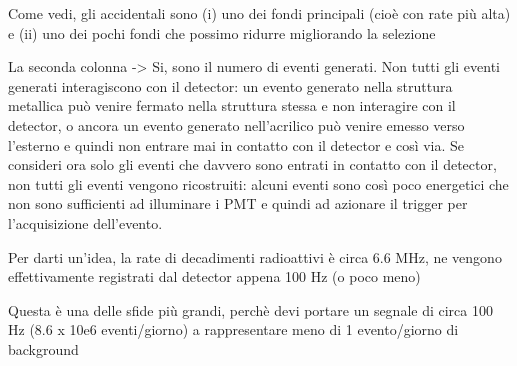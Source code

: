Come vedi, gli accidentali sono (i) uno dei fondi principali (cioè con rate più alta) e (ii) uno dei pochi fondi che possimo ridurre migliorando la selezione

La seconda colonna -> Si, sono il numero di eventi generati. Non tutti gli eventi generati interagiscono con il detector: un evento generato nella struttura metallica può venire fermato nella struttura stessa e non interagire con il detector, o ancora un evento generato nell'acrilico può venire emesso verso l'esterno e quindi non entrare mai in contatto con il detector e così via.
Se consideri ora solo gli eventi che davvero sono entrati in contatto con il detector, non tutti gli eventi vengono ricostruiti: alcuni eventi sono così poco energetici che non sono sufficienti ad illuminare i PMT e quindi ad azionare il trigger per l'acquisizione dell'evento.

Per darti un'idea, la rate di decadimenti radioattivi è circa 6.6 MHz, ne vengono effettivamente registrati dal detector appena 100 Hz (o poco meno)

Questa è una delle sfide più grandi, perchè devi portare un segnale di circa 100 Hz (8.6 x 10e6 eventi/giorno) a rappresentare meno di 1 evento/giorno di background	 
